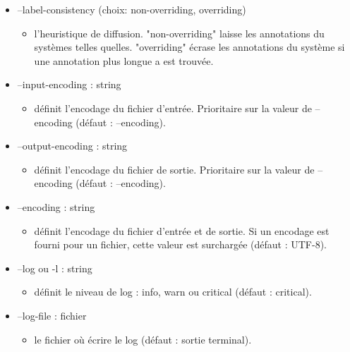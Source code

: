 \documentclass[manual-fr.tex]{subfiles}
\begin{document}
\begin{itemize}
\begin{itemize}
            \item[] --label-consistency (choix: non-overriding, overriding)
                \begin{itemize}
                    \item[] l'heuristique de diffusion. "non-overriding" laisse les annotations du systèmes telles quelles. "overriding" écrase les annotations du système si une annotation plus longue a est trouvée.
                \end{itemize}
            \item[] --input-encoding : string
                \begin{itemize}
                    \item[] définit l'encodage du fichier d'entrée. Prioritaire sur la valeur de --encoding (défaut : --encoding).
                \end{itemize}
            \item[] --output-encoding : string
                \begin{itemize}
                    \item[] définit l'encodage du fichier de sortie. Prioritaire sur la valeur de --encoding (défaut : --encoding).
                \end{itemize}
            \item[] --encoding : string
                \begin{itemize}
                    \item[] définit l'encodage du fichier d'entrée et de sortie. Si un encodage est fourni pour un fichier,
                        cette valeur est surchargée (défaut : UTF-8).
                \end{itemize}
            \item[] --log ou -l : string
                \begin{itemize}
                    \item[] définit le niveau de log : info, warn ou critical (défaut : critical).
                \end{itemize}
            \item[] --log-file : fichier
                \begin{itemize}
                    \item[] le fichier où écrire le log (défaut : sortie terminal).
                \end{itemize}
        \end{itemize}
\end{itemize}
\end{document}
